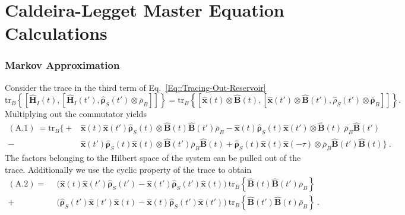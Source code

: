 	\section{Caldeira-Legget Master Equation Calculations} \label{Section::Appendix-Caldeira-Legget}
	\subsubsection{Markov Approximation}
	Consider the trace in the third term of Eq.~\eqref{Eq::Tracing-Out-Reservoir}
	\begin{equation}
			 \text{tr}_B \left\{  \left[\boldsymbol{\hat{H}}_I(t), \left[\boldsymbol{\hat{H}}_I(t'), \boldsymbol{\hat{\rho}}_S(t') \otimes \overline{\rho}_B \right]\right]  \right\} =	\text{tr}_B \left\{  \left[\hat{\boldsymbol{x}}(t) \otimes \hat{\boldsymbol{B}}(t), \left[{\boldsymbol{\hat{x}}}(t') \otimes \boldsymbol{\hat{B}}(t'), {\hat{\rho}}_S(t') \otimes \overline{\boldsymbol{\rho}}_B \right]\right]  \right\}.
	\end{equation}
	Multiplying out the commutator yields
		\begin{equation} \label{Eq::Caldeira-Leggett-Trace}
		\begin{split}
			(\text{A.1})~=\text{tr}_B \bigg \{+&\hat{\boldsymbol{x}}(t) \boldsymbol{\hat{x}}(t') \hat{\boldsymbol{\rho}}_S(t) \otimes \hat{\boldsymbol{B}}(t) \boldsymbol{\hat{B}}(t') \overline{\rho}_B
			- \hat{\boldsymbol{x}}(t)  \hat{\boldsymbol{\rho}}_S(t) \boldsymbol{\hat{x}}(t') \otimes \hat{\boldsymbol{B}}(t)  ~\overline{\rho}_B \boldsymbol{\hat{B}}(t')\\
			-&  \boldsymbol{\hat{x}}(t') \hat{\boldsymbol{\rho}}_S(t) \hat{\boldsymbol{x}}(t) \otimes  	\boldsymbol{\hat{B}}(t') \overline{\rho}_B \hat{\boldsymbol{B}}(t)
			+ \hat{\boldsymbol{\rho}}_S(t) \hat{\boldsymbol{x}}(t) \boldsymbol{\hat{x}}(-\tau)  \otimes \overline{\rho}_B \boldsymbol{\hat{B}}(t') \hat{\boldsymbol{B}}(t)   \bigg \}~.
		\end{split}
	\end{equation}
	The factors belonging to the Hilbert space of the system can be pulled out of the trace. Additionally we use the cyclic property of the trace to obtain
	\begin{equation} \label{Eq::first-appear-bath-corr}
		\begin{split}
			(\text{A}.2) =	~~  &\Big (\hat{\boldsymbol{x}}(t) \boldsymbol{\hat{x}}(t') \hat{\boldsymbol{\rho}}_S(t') - \boldsymbol{\hat{x}}(t') \hat{\boldsymbol{\rho}}_S(t') \hat{\boldsymbol{x}}(t)  \Big) ~ \text{tr}_B \left\{ \hat{\boldsymbol{B}}(t) \boldsymbol{\hat{B}}(t')\overline{\rho}_B \right\} \\
			+& \Big (  \hat{\boldsymbol{\rho}}_S(t') \boldsymbol{\hat{x}}(t') \hat{\boldsymbol{x}}(t)  - \hat{\boldsymbol{x}}(t) \hat{\boldsymbol{\rho}}_S(t') \boldsymbol{\hat{x}}(t')    \Big) ~ \text{tr}_B \left\{ \hat{\boldsymbol{B}}(t') \boldsymbol{\hat{B}}(t)\overline{\rho}_B \right\}  ~.
		\end{split}
	\end{equation}
